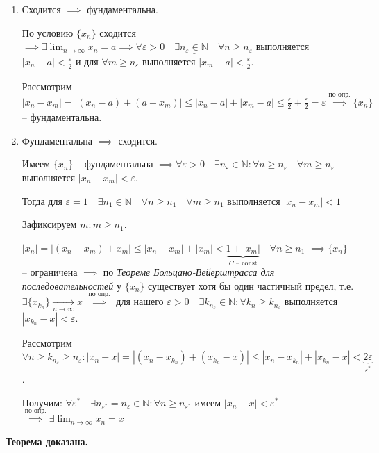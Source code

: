 \documentclass{article}
\newcommand{\bydef}{\stackrel{\text{по опр.}}{\implies}} %
\newcommand{\dslim}{\displaystyle\lim}
\newcommand{\dslimn}{\dslim_{n \to \infty}}
\theoremstyle{break}
\begin{document}
\begin{enumerate}
    \item Сходится $\implies$ фундаментальна.
    
    По условию $\{x_n\}$ сходится $\implies \exists \dslimn x_n = a
    \implies \underline{\forall \varepsilon > 0 \quad \exists n_\varepsilon \in \mathbb{N} \quad \forall n \ge n_\varepsilon}$
    выполняется $|x_n - a| < \frac{\varepsilon}{2}$ и для $\underline{\forall m \ge n_\varepsilon}$ 
    выполняется $|x_m - a| < \frac{\varepsilon}{2}$.

    Рассмотрим $\underline{|x_n - x_m|} = |(x_n - a) + (a - x_m)| 
    \le |x_n - a| + |x_m - a| \le \frac{\varepsilon}{2} + \frac{\varepsilon}{2} = \varepsilon
    \bydef \{x_n\}$ -- фундаментальна.

    \item Фундаментальна $\implies$ сходится.
    
    Имеем $\{x_n\}$ -- фундаментальна 
    $\implies \forall \varepsilon > 0 \quad \exists n_\varepsilon \in \mathbb{N}:
    \forall n \ge n_\varepsilon \quad \forall m \ge n_\varepsilon$ выполняется
    $|x_n - x_m| < \varepsilon$.

    Тогда для $\varepsilon = 1 \quad \exists n_1 \in \mathbb{N} \quad 
    \forall n \ge n_1 \quad \forall m \ge n_1$ выполняется $|x_n - x_m| < 1$

    Зафиксируем $m: m \ge n_1$.

    $|x_n| = |(x_n - x_m) + x_m| \le |x_n - x_m| + |x_m| < 
    \underbrace{1 + |x_m|}_{C \text{ -- const}} \quad \forall n \ge n_1$
    $\implies \{x_n\}$ -- ограничена $\implies$ по 
    \textit{Теореме Больцано-Вейерштрасса для последовательностей} у $\{x_n\}$
    существует хотя бы один частичный предел, т.е. 
    $\exists \{x_{k_n}\} \underset{n \to \infty}{\to} x$
    $\bydef$ для нашего $\varepsilon > 0 \quad \exists k_{n_\varepsilon} \in \mathbb{N}:
    \forall k_n \ge k_{n_\varepsilon}$ выполняется $|x_{k_n} - x| < \varepsilon$.

    Рассмотрим $\forall n \ge k_{n_\varepsilon} \ge n_\varepsilon:
    |x_n - x| = |(x_n - x_{k_n}) + (x_{k_n} - x)| \le |x_n - x_{k_n}| + |x_{k_n} - x|
    < \underbrace{2 \varepsilon}_{\varepsilon^*}$.

    Получим:
    $\forall \varepsilon^* \quad \exists n_{\varepsilon^*} = n_\varepsilon \in \mathbb{N}:
    \forall n \ge n_{\varepsilon^*}$ имеем $|x_n - x| < \varepsilon^*$
    $\bydef \exists \dslimn x_n = x$
\end{enumerate}
\textbf{Теорема доказана.}
\end{document}
